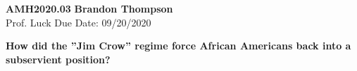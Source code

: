 \noindent
\textbf{AMH2020.03} \hfill \textbf{Brandon Thompson} \\
\normalsize Prof. Luck \hfill Due Date: 09/20/2020 \\

\begin{center}
\textbf{How did the ''Jim Crow'' regime force African Americans back into a subservient position?}
\end{center}